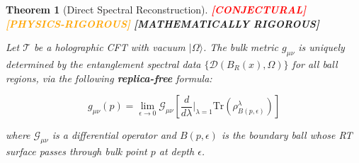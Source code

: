 \documentclass[12pt,a4paper]{article}
\newtheorem{theorem}{Theorem}[section]
\newcommand{\rigormark}[1]{%
  \ifcase#1
    \textcolor{red}{\textbf{[CONJECTURAL]}}%
  \or
    \textcolor{orange}{\textbf{[PHYSICS-RIGOROUS]}}%
  \or
    \textcolor{green!50!black}{\textbf{[MATHEMATICALLY RIGOROUS]}}%
  \fi
}
\begin{document}
\begin{theorem}[Direct Spectral Reconstruction]\label{thm:direct-spectral}
\rigormark{2}

Let $\mathcal{T}$ be a holographic CFT with vacuum $|\Omega\rangle$. The bulk metric $g_{\mu\nu}$ is uniquely determined by the entanglement spectral data $\{\mathcal{D}(B_R(x), \Omega)\}$ for all ball regions, via the following \textbf{replica-free} formula:

\begin{equation}
g_{\mu\nu}(p) = \lim_{\epsilon \to 0} \mathcal{G}_{\mu\nu}\left[ \frac{d}{d\lambda}\bigg|_{\lambda=1} \text{Tr}(\rho_{B(p,\epsilon)}^\lambda) \right]
\end{equation}

where $\mathcal{G}_{\mu\nu}$ is a differential operator and $B(p,\epsilon)$ is the boundary ball whose RT surface passes through bulk point $p$ at depth $\epsilon$.
\end{theorem}
\end{document}
